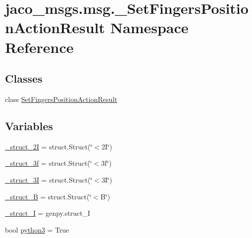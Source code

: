 \hypertarget{namespacejaco__msgs_1_1msg_1_1__SetFingersPositionActionResult}{}\section{jaco\+\_\+msgs.\+msg.\+\_\+\+Set\+Fingers\+Position\+Action\+Result Namespace Reference}
\label{namespacejaco__msgs_1_1msg_1_1__SetFingersPositionActionResult}
\subsection*{Classes}
\begin{DoxyCompactItemize}
\item 
class \hyperlink{classjaco__msgs_1_1msg_1_1__SetFingersPositionActionResult_1_1SetFingersPositionActionResult}{Set\+Fingers\+Position\+Action\+Result}
\end{DoxyCompactItemize}
\subsection*{Variables}
\begin{DoxyCompactItemize}
\item 
\hyperlink{namespacejaco__msgs_1_1msg_1_1__SetFingersPositionActionResult_a51b17c8fcdc1d3318a13b0a9debde22f}{\+\_\+struct\+\_\+2I} = struct.\+Struct(\char`\"{}$<$2\+I\char`\"{})
\item 
\hyperlink{namespacejaco__msgs_1_1msg_1_1__SetFingersPositionActionResult_a3b81706a21217a0c2ede672be88296d7}{\+\_\+struct\+\_\+3f} = struct.\+Struct(\char`\"{}$<$3f\char`\"{})
\item 
\hyperlink{namespacejaco__msgs_1_1msg_1_1__SetFingersPositionActionResult_a5a7ac381217d089e5c8226db723fb01c}{\+\_\+struct\+\_\+3I} = struct.\+Struct(\char`\"{}$<$3\+I\char`\"{})
\item 
\hyperlink{namespacejaco__msgs_1_1msg_1_1__SetFingersPositionActionResult_ad1491e7c2b0c40710085b047e10f0b9a}{\+\_\+struct\+\_\+B} = struct.\+Struct(\char`\"{}$<$B\char`\"{})
\item 
\hyperlink{namespacejaco__msgs_1_1msg_1_1__SetFingersPositionActionResult_ab57eb8427a7eff8651053ed238f3c5a1}{\+\_\+struct\+\_\+I} = genpy.\+struct\+\_\+I
\item 
bool \hyperlink{namespacejaco__msgs_1_1msg_1_1__SetFingersPositionActionResult_a1e0330e8b986d85361f141e8670e045c}{python3} = True
\end{DoxyCompactItemize}


